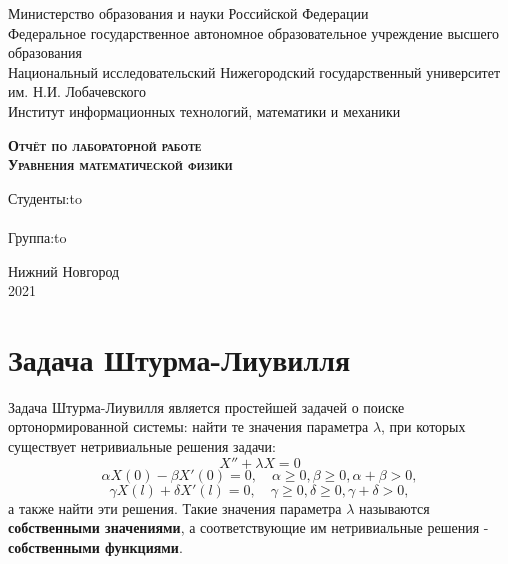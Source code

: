 \documentclass[12pt, a4paper]{report}
\begin{document}
\begin{titlepage}
\newpage

\begin{center}
Министерство образования и науки Российской Федерации \\
Федеральное государственное автономное образовательное
учреждение высшего образования \\
Национальный исследовательский Нижегородский государственный
университет им. Н.И. Лобачевского \\
Институт информационных технологий, математики и механики \\
\end{center}

\vspace{12em}

\begin{center}
\textsc{\textbf{Отчёт по лабораторной работе}}\\
\textsc{\textbf{Уравнения математической физики}}
\end{center}

\vspace{14em}



\newbox{\lbox}
\newlength{\maxl}
\setlength{\maxl}{\wd\lbox}
\hfill\parbox{11cm}{
\hspace*{5cm}\hspace*{-5cm}Студенты:\hfill\hbox to\\
\\
\hspace*{5cm}\hspace*{-5cm}Группа:\hfill\hbox to\\
}


\vspace{\fill}

\begin{center}
Нижний Новгород \\2021
\end{center}

\end{titlepage}       

\chapter{Задача Штурма-Лиувилля}

Задача Штурма-Лиувилля является простейшей задачей о поиске ортонормированной системы: найти те значения параметра $\lambda$, при которых существует нетривиальные решения задачи:
\[ X'' + \lambda X = 0 \]
\[ \alpha X(0) - \beta X'(0) = 0, \quad \alpha \geq 0, \beta \geq 0, \alpha + \beta > 0, \]
\[ \gamma X(l) + \delta X'(l) = 0, \quad \gamma \geq 0, \delta \geq 0, \gamma + \delta > 0, \]
а также найти эти решения. Такие значения параметра $\lambda$ называются \textbf{собственными значениями}, а соответствующие им нетривиальные решения - \textbf{собственными функциями}.
\end{document}
